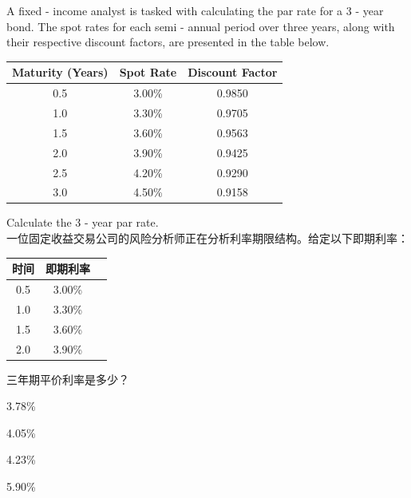 \documentclass{article}
\newcounter{question} %
\begin{document}
    \begin{question}
        A fixed - income analyst is tasked with calculating the par rate for a 3 - year bond. The spot rates for each semi - annual period over three years, along with their respective discount factors, are presented in the table below.
        \begin{center}
        \begin{tabular}{|c|c|c|}
        \hline
        Maturity (Years) & Spot Rate & Discount Factor \\
        \hline
        0.5 & 3.00\% & 0.9850 \\
        \hline
        1.0 & 3.30\% & 0.9705 \\
        \hline
        1.5 & 3.60\% & 0.9563 \\
        \hline
        2.0 & 3.90\% & 0.9425 \\
        \hline
        2.5 & 4.20\% & 0.9290 \\
        \hline
        3.0 & 4.50\% & 0.9158 \\
        \hline
        \end{tabular}
        \end{center}
        Calculate the 3 - year par rate.
        \\一位固定收益交易公司的风险分析师正在分析利率期限结构。给定以下即期利率：
        \begin{center}
        \begin{tabular}{|c|c|c|}
        \hline
        时间 & 即期利率 \\
        \hline
        0.5 & 3.00\% \\
        \hline
        1.0 & 3.30\% \\
        \hline
        1.5 & 3.60\% \\
        \hline
        2.0 & 3.90\% \\
        \hline
        \end{tabular}
        \end{center}
        三年期平价利率是多少？
        \end{question}
        
        \begin{choices}
            \item 3.78\%
            \item 4.05\%
            \item 4.23\%
            \item 5.90\%
        \end{choices}
        
\end{document}
